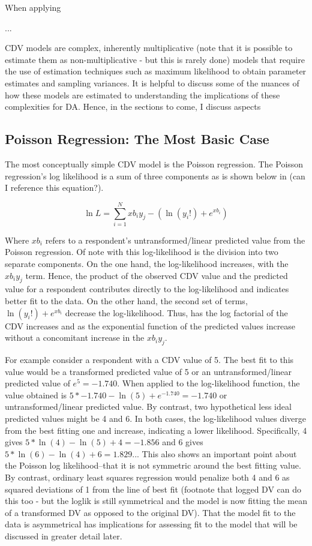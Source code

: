 \documentclass[ShortAfour,times,sageapa]{sagej}
\begin{document}
	When applying
	
	...
	
	
	CDV models are complex, inherently multiplicative (note that it is possible to estimate them as non-multiplicative - but this is rarely done) models that require the use of estimation techniques such as maximum likelihood to obtain parameter estimates and sampling variances.
	It is helpful to discuss some of the nuances of how these models are estimated to understanding the implications of these complexities for DA.
	Hence, in the sections to come, I discuss aspects 

	\subsection{Poisson Regression: The Most Basic Case}
	
	The most conceptually simple CDV model is the Poisson regression.  
	The Poisson regression's log likelihood is a sum of three components as is shown below in (can I reference this equation?).
	
	\begin{equation}
		\ln L = \sum_{i=1}^{N} xb_{i}y_{j} - (\ln (y_{i}!) + e^{xb_{i}})
	\end{equation}

	Where $xb_{i}$ refers to a respondent's untransformed/linear predicted value from the Poisson regression.  
	Of note with this log-likelihood is the division into two separate components.  
	On the one hand, the log-likelihood increases, with the $xb_{i}y_{j}$ term.  
	Hence, the product of the observed CDV value and the predicted value for a respondent contributes directly to the log-likelihood and indicates better fit to the data.
	On the other hand, the second set of terms, $\ln (y_{i}!) + e^{xb_{i}}$ decrease the log-likelihood.  
	Thus, has the log factorial of the CDV increases and as the exponential function of the predicted values increase without a concomitant increase in the $xb_{i}y_{j}$.
	
	For example consider a respondent with a CDV value of 5.  
	The best fit to this value would be a transformed predicted value of 5 or an untransformed/linear predicted value of $e^{5} = -1.740$.  
	When applied to the log-likelihood function, the value obtained is $5*-1.740 - \ln (5) + e^{-1.740} = -1.740$ or untransformed/linear predicted value.
	By contrast, two hypothetical less ideal predicted values might be 4 and 6.  
	In both cases, the log-likelihood values diverge from the best fitting one and increase, indicating a lower likelihood.
	Specifically, 4 gives $5*\ln (4) - \ln (5) + 4 = -1.856$ and 6 gives $5*\ln (6) - \ln (4) + 6 = 1.829$...
	This also shows an important point about the Poisson log likelihood--that it is not symmetric around the best fitting value.  
	By contrast, ordinary least squares regression would penalize both 4 and 6 as squared deviations of 1 from the line of best fit (footnote that logged DV can do this too - but the loglik is still symmetrical and the model is now fitting the mean of a transformed DV as opposed to the original DV).
	That the model fit to the data is asymmetrical has implications for assessing fit to the model that will be discussed in greater detail later.
	
\end{document}
